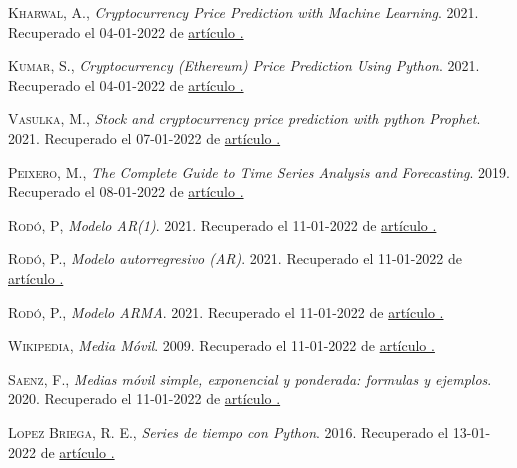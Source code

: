 \documentclass[a4paper,10pt]{article}
\begin{document}
\begin{thebibliography}{X}
 \textsc{Kharwal, A.}, \textit{Cryptocurrency Price Prediction with Machine Learning}. 2021. Recuperado el 04-01-2022 de \href{https://thecleverprogrammer.com/2021/12/27/cryptocurrency-price-prediction-with-machine-learning/}{artículo \faExternalLink.}

 \textsc{Kumar, S.}, \textit{Cryptocurrency (Ethereum) Price Prediction Using Python}. 2021. Recuperado el 04-01-2022 de \href{https://www.godatainsights.com/post/cryptocurrency-ethereum-price-prediction-using-python}{artículo \faExternalLink.}

 \textsc{Vasulka, M.}, \textit{Stock and cryptocurrency price prediction with python Prophet}. 2021. Recuperado el 07-01-2022 de \href{https://tcoil.info/stock-and-cryptocurrency-price-prediction-with-python-prophet/}{artículo \faExternalLink.}

 \textsc{Peixero, M.}, \textit{The Complete Guide to Time Series Analysis and Forecasting}. 2019. Recuperado el 08-01-2022 de \href{https://towardsdatascience.com/the-complete-guide-to-time-series-analysis-and-forecasting-70d476bfe775}{artículo \faExternalLink.}

 \textsc{Rodó, P}, \textit{Modelo AR(1)}. 2021. Recuperado el 11-01-2022 de \href{https://economipedia.com/definiciones/modelo-ar1.html}{artículo \faExternalLink.}

 \textsc{Rodó, P.}, \textit{Modelo autorregresivo (AR)}. 2021. Recuperado el 11-01-2022 de \href{https://economipedia.com/definiciones/modelo-autorregresivo-ar.html}{artículo \faExternalLink.}

 \textsc{Rodó, P.}, \textit{Modelo ARMA}. 2021. Recuperado el 11-01-2022 de \href{https://economipedia.com/definiciones/modelo-arma.html}{artículo \faExternalLink.}

 \textsc{Wikipedia}, \textit{Media Móvil}. 2009. Recuperado el 11-01-2022 de \href{https://es.wikipedia.org/wiki/Media_movil#Media_movil_simple}{artículo \faExternalLink.}

 \textsc{Saenz, F.}, \textit{Medias móvil simple, exponencial y ponderada: formulas y ejemplos}. 2020. Recuperado el 11-01-2022 de \href{https://www.rankia.cl/blog/analisis-ipsa/2039072-medias-movil-simple-exponencial-ponderada-formulas-ejemplos}{artículo \faExternalLink.}

 \textsc{Lopez Briega, R. E.}, \textit{Series de tiempo con Python}. 2016. Recuperado el 13-01-2022 de \href{https://relopezbriega.github.io/blog/2016/09/26/series-de-tiempo-con-python/}{artículo \faExternalLink.}


\end{thebibliography}
\end{document}
